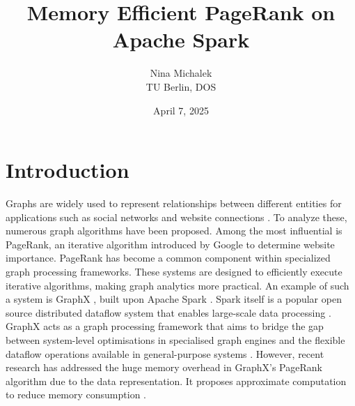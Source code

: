 \documentclass[a4paper,12pt]{article}
\title{Memory Efficient PageRank on Apache Spark}
\author{Nina Michalek\\TU Berlin, DOS}
\date{April 7, 2025}
\begin{document}
\maketitle


\section{Introduction}
 Graphs are widely used to represent relationships between different entities for applications such as social networks and website connections \cite{zhang_distributed_2021}. 
To analyze these, numerous graph algorithms have been proposed. Among the most influential is PageRank, an iterative algorithm introduced by Google to determine website importance. PageRank has become a common component within specialized graph processing frameworks. These systems are designed to efficiently execute iterative algorithms, making graph analytics more practical. An example of such a system is GraphX \cite{xin_graphx_2013}, built upon Apache Spark \cite{xin_graphx_2013}. Spark itself is a popular open source distributed dataflow system that enables large-scale data processing \cite{shanahan_large_2015}. GraphX acts as a graph processing framework that aims to bridge the gap between system-level optimisations in specialised graph engines and the flexible dataflow operations available in general-purpose systems \cite{jin_software_2022}. However, recent research has addressed the huge memory overhead in GraphX's PageRank algorithm due to the data representation. It proposes approximate computation to reduce memory consumption \cite{wu_efficient_2024}. 
 
\end{document}
